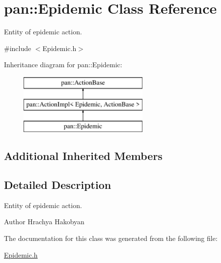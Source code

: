 \hypertarget{classpan_1_1_epidemic}{}\section{pan\+:\+:Epidemic Class Reference}
\label{classpan_1_1_epidemic}


Entity of epidemic action.  




{\ttfamily \#include $<$Epidemic.\+h$>$}

Inheritance diagram for pan\+:\+:Epidemic\+:\begin{figure}[H]
\begin{center}
\leavevmode
\includegraphics[height=3.000000cm]{classpan_1_1_epidemic}
\end{center}
\end{figure}
\subsection*{Additional Inherited Members}


\subsection{Detailed Description}
Entity of epidemic action. 

\begin{DoxyAuthor}{Author}
Hrachya Hakobyan 
\end{DoxyAuthor}


The documentation for this class was generated from the following file\+:\begin{DoxyCompactItemize}
\item 
\hyperlink{_epidemic_8h}{Epidemic.\+h}\end{DoxyCompactItemize}
